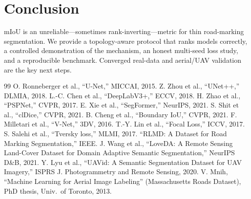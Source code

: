 \documentclass[10pt,twocolumn]{article}
\begin{document}
\section{Conclusion}
mIoU is an unreliable---sometimes rank-inverting---metric for thin road-marking
segmentation. We provide a topology-aware protocol that ranks models correctly, a
controlled demonstration of the mechanism, an honest multi-seed loss study, and a
reproducible benchmark. Converged real-data and aerial/UAV validation are the key
next steps.

\begin{thebibliography}{99}\small
{} O. Ronneberger et al., ``U-Net,'' MICCAI, 2015.
 Z. Zhou et al., ``UNet++,'' DLMIA, 2018.
 L.-C. Chen et al., ``DeepLabV3+,'' ECCV, 2018.
 H. Zhao et al., ``PSPNet,'' CVPR, 2017.
 E. Xie et al., ``SegFormer,'' NeurIPS, 2021.
 S. Shit et al., ``clDice,'' CVPR, 2021.
 B. Cheng et al., ``Boundary IoU,'' CVPR, 2021.
 F. Milletari et al., ``V-Net,'' 3DV, 2016.
 T.-Y. Lin et al., ``Focal Loss,'' ICCV, 2017.
 S. Salehi et al., ``Tversky loss,'' MLMI, 2017.
 ``RLMD: A Dataset for Road Marking Segmentation,'' IEEE.
 J. Wang et al., ``LoveDA: A Remote Sensing Land-Cover Dataset for
Domain Adaptive Semantic Segmentation,'' NeurIPS D\&B, 2021.
 Y. Lyu et al., ``UAVid: A Semantic Segmentation Dataset for UAV
Imagery,'' ISPRS J. Photogrammetry and Remote Sensing, 2020.
 V. Mnih, ``Machine Learning for Aerial Image Labeling''
(Massachusetts Roads Dataset), PhD thesis, Univ.\ of Toronto, 2013.
\end{thebibliography}
\end{document}
